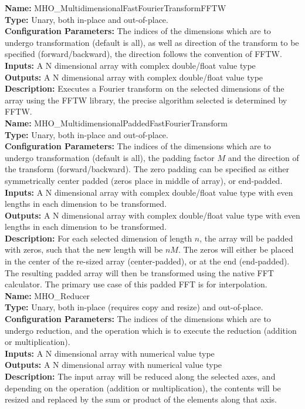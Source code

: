 \noindent \textbf{Name:} MHO\_MultidimensionalFastFourierTransformFFTW \\
\textbf{Type:} Unary, both in-place and out-of-place. \\
\textbf{Configuration Parameters:} The indices of the dimensions which are to undergo transformation (default is all), as well as direction of the transform to be specified (forward/backward), the direction follows the convention of FFTW.\\
\textbf{Inputs:} A N dimensional array with complex double/float value type \\
\textbf{Outputs:} A N dimensional array with complex double/float value type \\
\textbf{Description:} Executes a Fourier transform on the selected dimensions of the array using the FFTW library, the precise algorithm selected is determined by FFTW.\\


\noindent \textbf{Name:} MHO\_MultidimensionalPaddedFastFourierTransform \\
\textbf{Type:} Unary, both in-place and out-of-place. \\
\textbf{Configuration Parameters:} The indices of the dimensions which are to undergo transformation (default is all),
the padding factor $M$ and the direction of the transform (forward/backward). The zero padding can be specified as either symmetrically center padded (zeros place in middle of array), or end-padded.\\
\textbf{Inputs:} A N dimensional array with complex double/float value type with even lengths in each dimension to be transformed. \\
\textbf{Outputs:} A N dimensional array with complex double/float value type with even lengths in each dimension to be transformed.\\
\textbf{Description:} For each selected dimension of length $n$, the array will be padded with zeros, such that the new length will be $nM$. The zeros will either be placed in the center of the re-sized array (center-padded), or at the end (end-padded). The resulting padded array will then be transformed using the native FFT calculator. The primary use case of this padded FFT is for interpolation.\\


\noindent \textbf{Name:} MHO\_Reducer  \\
\textbf{Type:} Unary, both in-place (requires copy and resize) and out-of-place. \\
\textbf{Configuration Parameters:} The indices of the dimensions which are to undergo reduction, and the operation which is to execute the reduction (addition or multiplication). \\
\textbf{Inputs:} A N dimensional array with numerical value type\\
\textbf{Outputs:} A N dimensional array with numerical value type\\
\textbf{Description:} The input array will be reduced along the selected axes, and depending on the operation (addition or multiplication), the contents will be resized and replaced by the sum or product of the elements along that axis.\\

